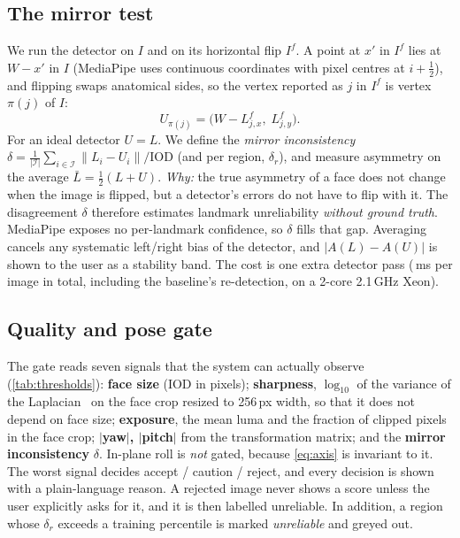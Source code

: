 \subsection{The mirror test}
\label{sec:mirror}
We run the detector on $I$ and on its horizontal flip $I^{f}$. A point at $x'$ in $I^{f}$
lies at $W-x'$ in $I$ (MediaPipe uses continuous coordinates with pixel centres at
$i+\tfrac12$), and flipping swaps anatomical sides, so the vertex reported as $j$ in $I^{f}$
is vertex $\pi(j)$ of $I$:
\begin{equation}
U_{\pi(j)} = \bigl(W-L^{f}_{j,x},\;L^{f}_{j,y}\bigr).
\end{equation}
For an ideal detector $U\!=\!L$. We define the \emph{mirror inconsistency}
$\delta=\tfrac{1}{|\mathcal{I}|}\sum_{i\in\mathcal{I}}\|L_i-U_i\|/\mathrm{IOD}$ (and per region,
$\delta_r$), and measure asymmetry on the average $\bar L=\tfrac12(L+U)$.
\emph{Why:} the true asymmetry of a face does not change when the image is flipped, but
a detector's errors do not have to flip with it. The disagreement $\delta$ therefore
estimates landmark unreliability \emph{without ground truth}. MediaPipe exposes no
per-landmark confidence, so $\delta$ fills that gap. Averaging cancels any systematic
left/right bias of the detector, and $|A(L)-A(U)|$ is shown to the user as a stability
band. The cost is one extra detector pass (\runtime\,ms per image in total, including the
baseline's re-detection, on a 2-core 2.1\,GHz Xeon).

\subsection{Quality and pose gate}
\label{sec:gate}
The gate reads seven signals that the system can actually observe
(\cref{tab:thresholds}):
\textbf{face size} (IOD in pixels);
\textbf{sharpness}, $\log_{10}$ of the variance of the Laplacian~\cite{pertuz2013focus} on the face crop
resized to 256\,px width, so that it does not depend on face size;
\textbf{exposure}, the mean luma and the fraction of clipped pixels in the face crop;
\textbf{$|$yaw$|$, $|$pitch$|$} from the transformation matrix;
and the \textbf{mirror inconsistency} $\delta$.
In-plane roll is \emph{not} gated, because \cref{eq:axis} is invariant to it.
The worst signal decides accept / caution / reject, and every decision is shown with a
plain-language reason. A rejected image never shows a score unless the user explicitly
asks for it, and it is then labelled unreliable. In addition, a region whose
$\delta_r$ exceeds a training percentile is marked \emph{unreliable} and greyed out.

